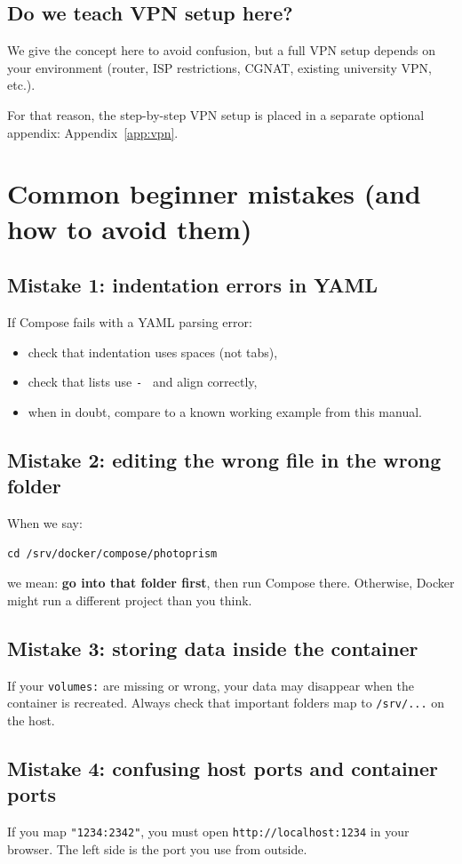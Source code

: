 \subsection{Do we teach VPN setup here?}
We give the concept here to avoid confusion, but a full VPN setup depends on your environment
(router, ISP restrictions, CGNAT, existing university VPN, etc.).

For that reason, the step-by-step VPN setup is placed in a separate optional appendix:
Appendix~\ref{app:vpn}.

\section{Common beginner mistakes (and how to avoid them)}
\subsection{Mistake 1: indentation errors in YAML}
If Compose fails with a YAML parsing error:
\begin{itemize}[leftmargin=*]
  \item check that indentation uses spaces (not tabs),
  \item check that lists use \texttt{- } and align correctly,
  \item when in doubt, compare to a known working example from this manual.
\end{itemize}

\subsection{Mistake 2: editing the wrong file in the wrong folder}
When we say:
\begin{lstlisting}
cd /srv/docker/compose/photoprism
\end{lstlisting}
we mean: \textbf{go into that folder first}, then run Compose there.
Otherwise, Docker might run a different project than you think.

\subsection{Mistake 3: storing data inside the container}
If your \texttt{volumes:} are missing or wrong, your data may disappear when the container is recreated.
Always check that important folders map to \texttt{/srv/...} on the host.

\subsection{Mistake 4: confusing host ports and container ports}
If you map \texttt{"1234:2342"}, you must open \texttt{http://localhost:1234} in your browser.
The left side is the port you use from outside.

